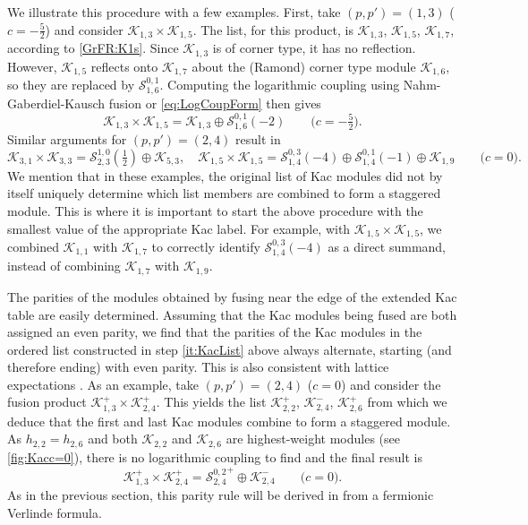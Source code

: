 \documentclass[a4paper,reqno,12pt]{report}
\theoremstyle{definition}
\numberwithin{equation}{section}
\newcommand{\Kac}[1]{\mathcal{K}_{#1}}       %
\newcommand{\Stag}[2]{\mathcal{S}_{#1}^{#2}} %
\newcommand{\fuse}{\mathbin{\times}}                                            %
\newcommand{\hw}{highest-weight}
\newcommand{\hwms}{\hw{} modules}
\newcommand{\NGK}{Nahm-Gaberdiel-Kausch}
\theoremstyle{plain}
\begin{document}
We illustrate this procedure with a few examples.  First, take $(p,p')=(1,3)$ ($c=-\frac{5}{2}$) and consider $\Kac{1,3} \fuse \Kac{1,5}$.  The list, for this product, is $\Kac{1,3}$, $\Kac{1,5}$, $\Kac{1,7}$, according to \eqref{GrFR:K1s}.  Since $\Kac{1,3}$ is of corner type, it has no reflection.  However, $\Kac{1,5}$ reflects onto $\Kac{1,7}$ about the (Ramond) corner type module $\Kac{1,6}$, so they are replaced by $\Stag{1,6}{0,1}$.  Computing the logarithmic coupling using \NGK{} fusion or \eqref{eq:LogCoupForm} then gives
\begin{equation} \label{FR:K13K15}
\Kac{1,3} \fuse \Kac{1,5} = \Kac{1,3} \oplus \Stag{1,6}{0,1}(-2) \qquad \text{(\(c = -\tfrac{5}{2}\)).}
\end{equation}
Similar arguments for $(p,p')=(2,4)$ result in
\begin{equation}
\Kac{3,1} \fuse \Kac{3,3} = \Stag{2,3}{1,0}(\tfrac{1}{2}) \oplus \Kac{5,3}, \quad
\Kac{1,5} \fuse \Kac{1,5} = \Stag{1,4}{0,3}(-4) \oplus \Stag{1,4}{0,1}(-1) \oplus \Kac{1,9} \qquad \text{(\(c = 0\)).}
\end{equation}
We mention that in these examples, the original list of Kac modules did not by itself uniquely determine which list members are combined to form a staggered module.  This is where it is important to start the above procedure with the smallest value of the appropriate Kac label.  For example, with $\Kac{1,5} \fuse \Kac{1,5}$, we combined $\Kac{1,1}$ with $\Kac{1,7}$ to correctly identify $\Stag{1,4}{0,3}(-4)$ as a direct summand, instead of combining $\Kac{1,7}$ with $\Kac{1,9}$.

The parities of the modules obtained by fusing near the edge of the extended Kac table are easily determined.  Assuming that the Kac modules being fused are both assigned an even parity, we find that the parities of the Kac modules in the ordered list constructed in step \ref{it:KacList} above always alternate, starting (and therefore ending) with even parity.  This is also consistent with lattice expectations \cite{PeaLog14}.  As an example, take $(p,p')=(2,4)$ ($c=0$) and consider the fusion product $\Kac{1,3}^+ \fuse \Kac{2,4}^+$.  This yields the list $\Kac{2,2}^+$, $\Kac{2,4}^-$, $\Kac{2,6}^+$ from which we deduce that the first and last Kac modules combine to form a staggered module.  As $h_{2,2} = h_{2,6}$ and both $\Kac{2,2}$ and $\Kac{2,6}$ are \hwms{} (see \cref{fig:Kacc=0}), there is no logarithmic coupling to find and the final result is
\begin{equation}
\Kac{1,3}^+ \fuse \Kac{2,4}^+ = {\Stag{2,4}{0,2}}^+ \oplus \Kac{2,4}^- \qquad \text{(\(c = 0\)).}
\end{equation}
As in the previous section, this parity rule will be derived in \cite{CanFusII15} from a fermionic Verlinde formula.
\end{document}
